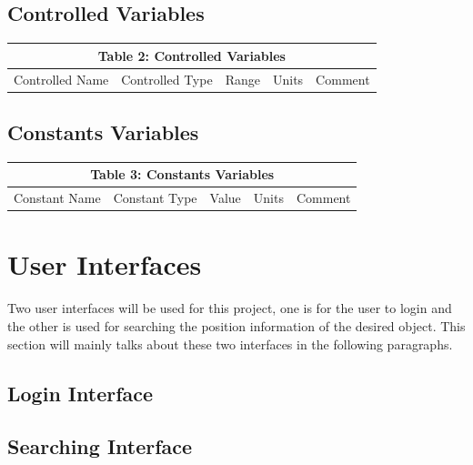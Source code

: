 \documentclass[12pt, titlepage]{article}
\begin{document}
\subsection{Controlled Variables}
\begin{tabular}{|l|l|l|l|l|}

\hline \multicolumn{5}{|c|}{Table 2: Controlled Variables}\\

\hline Controlled Name&Controlled Type&Range&Units &Comment\\



\hline

\end{tabular}
\subsection{Constants Variables}
\begin{tabular}{|l|l|l|l|l|}

\hline \multicolumn{5}{|c|}{Table 3: Constants Variables}\\

\hline Constant Name&Constant Type&Value&Units &Comment\\



\hline

\end{tabular}




\section{User Interfaces}

Two user interfaces will be used for this project, one is for the user to login and the other is used for searching the position information of the desired object. This section will mainly talks about these two interfaces in the following paragraphs. 

\subsection{Login Interface}


\subsection{Searching Interface}
\end{document}
